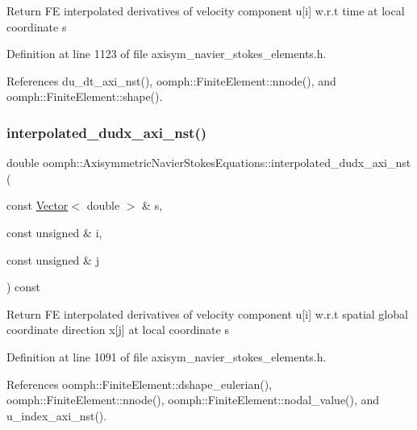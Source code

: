 Return FE interpolated derivatives of velocity component u\mbox{[}i\mbox{]} w.\+r.\+t time at local coordinate s 

Definition at line 1123 of file axisym\+\_\+navier\+\_\+stokes\+\_\+elements.\+h.



References du\+\_\+dt\+\_\+axi\+\_\+nst(), oomph\+::\+Finite\+Element\+::nnode(), and oomph\+::\+Finite\+Element\+::shape().

\mbox{\label{classoomph_1_1AxisymmetricNavierStokesEquations_a233e8e9b387e218ed8047f66778561b2}} 
\subsubsection{\texorpdfstring{interpolated\+\_\+dudx\+\_\+axi\+\_\+nst()}{interpolated\_dudx\_axi\_nst()}}
{\footnotesize\ttfamily double oomph\+::\+Axisymmetric\+Navier\+Stokes\+Equations\+::interpolated\+\_\+dudx\+\_\+axi\+\_\+nst (\begin{DoxyParamCaption}\item[{const \hyperlink{classoomph_1_1Vector}{Vector}$<$ double $>$ \&}]{s,  }\item[{const unsigned \&}]{i,  }\item[{const unsigned \&}]{j }\end{DoxyParamCaption}) const\hspace{0.3cm}{\ttfamily [inline]}}

Return FE interpolated derivatives of velocity component u\mbox{[}i\mbox{]} w.\+r.\+t spatial global coordinate direction x\mbox{[}j\mbox{]} at local coordinate s 

Definition at line 1091 of file axisym\+\_\+navier\+\_\+stokes\+\_\+elements.\+h.



References oomph\+::\+Finite\+Element\+::dshape\+\_\+eulerian(), oomph\+::\+Finite\+Element\+::nnode(), oomph\+::\+Finite\+Element\+::nodal\+\_\+value(), and u\+\_\+index\+\_\+axi\+\_\+nst().




